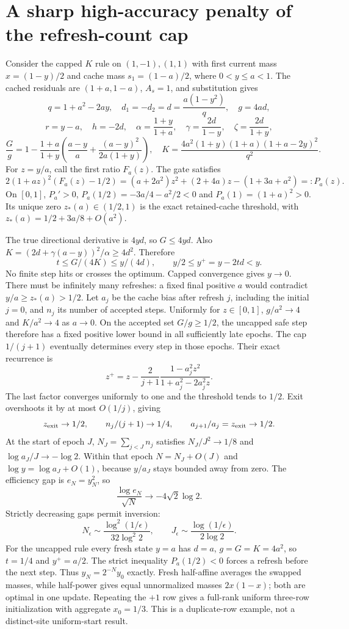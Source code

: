 \section{A sharp high-accuracy penalty of the refresh-count cap}
Consider the capped $K$ rule on $(1,-1),(1,1)$ with first current mass $x=(1-y)/2$ and cache mass $s_1=(1-a)/2$, where $0<y\le a<1$. The cached residuals are $(1+a,1-a)$, $A_s=1$, and substitution gives
\[
 q=1+a^2-2ay,\quad d_1=-d_2=d=\frac{a(1-y^2)}q,\quad g=4ad,
\]
\[
 r=y-a,\quad h=-2d,\quad\alpha=\frac{1+y}{1+a},\quad
 \gamma=\frac{2d}{1-y},\quad\zeta=\frac{2d}{1+y},
\]
\[
 \frac Gg=1-\frac{1+a}{1+y}
 \left(\frac{a-y}{a}+\frac{(a-y)^2}{2a(1+y)}\right),\quad
 K=\frac{4a^2(1+y)(1+a)(1+a-2y)^2}{q^2}.
\]
For $z=y/a$, call the first ratio $F_a(z)$. The gate satisfies
\[
 2(1+az)^2(F_a(z)-1/2)
 =(a+2a^2)z^2+(2+4a)z-(1+3a+a^2)=:P_a(z).
\]
On $[0,1]$, $P_a'>0$, $P_a(1/2)=-3a/4-a^2/2<0$ and $P_a(1)=(1+a)^2>0$.
Its unique zero $z_*(a)\in(1/2,1)$ is the exact retained-cache threshold, with $z_*(a)=1/2+3a/8+O(a^2)$.

The true directional derivative is $4yd$, so $G\le4yd$.
Also $K=(2d+\gamma(a-y))^2/\alpha\ge4d^2$. Therefore
\[
 t\le G/(4K)\le y/(4d),\qquad y/2\le y^+=y-2td<y.
\]
No finite step hits or crosses the optimum. Capped convergence gives $y\to0$.
There must be infinitely many refreshes: a fixed final positive $a$ would contradict $y/a\ge z_*(a)>1/2$.
Let $a_j$ be the cache bias after refresh $j$, including the initial $j=0$, and $n_j$ its number of accepted steps.
Uniformly for $z\in[0,1]$, $g/a^2\to4$ and $K/a^2\to4$ as $a\to0$.
On the accepted set $G/g\ge1/2$, the uncapped safe step therefore has a fixed positive lower bound in all sufficiently late epochs. The cap $1/(j+1)$ eventually determines every step in those epochs.
Their exact recurrence is
\[
 z^+=z-\frac2{j+1}
       \frac{1-a_j^2z^2}{1+a_j^2-2a_j^2z}.
\]
The last factor converges uniformly to one and the threshold tends to $1/2$.
Exit overshoots it by at most $O(1/j)$, giving
\[
 z_{\rm exit}\to1/2,\qquad n_j/(j+1)\to1/4,\qquad
 a_{j+1}/a_j=z_{\rm exit}\to1/2.
\]
At the start of epoch $J$, $N_J=\sum_{j<J}n_j$ satisfies
$N_J/J^2\to1/8$ and $\log a_J/J\to-\log2$.
Within that epoch $N=N_J+O(J)$ and $\log y=\log a_J+O(1)$, because $y/a_J$ stays bounded away from zero.
The efficiency gap is $e_N=y_N^2$, so
\[
 \frac{\log e_N}{\sqrt N}\longrightarrow-4\sqrt2\log2.
\]
Strictly decreasing gaps permit inversion:
\[
 N_\epsilon\sim\frac{\log^2(1/\epsilon)}{32\log^2 2},\qquad
 J_\epsilon\sim\frac{\log(1/\epsilon)}{2\log2}.
\]
For the uncapped rule every fresh state $y=a$ has $d=a$, $g=G=K=4a^2$, so $t=1/4$ and $y^+=a/2$.
The strict inequality $P_a(1/2)<0$ forces a refresh before the next step.
Thus $y_N=2^{-N}y_0$ exactly.
Fresh half-affine averages the swapped masses, while half-power gives equal unnormalized masses $2x(1-x)$; both are optimal in one update.
Repeating the $+1$ row gives a full-rank uniform three-row initialization with aggregate $x_0=1/3$.
This is a duplicate-row example, not a distinct-site uniform-start result.

